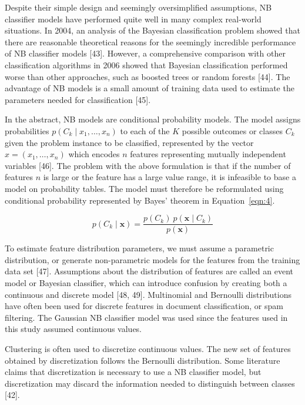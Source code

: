 \documentclass[sn-mathphys-num]{sn-jnl}%
\begin{document}
Despite their simple design and seemingly oversimplified assumptions, NB classifier models have performed quite well in many complex real-world situations. In 2004, an analysis of the Bayesian classification problem showed that there are reasonable theoretical reasons for the seemingly incredible performance of NB classifier models [43]. However, a comprehensive comparison with other classification algorithms in 2006 showed that Bayesian classification performed worse than other approaches, such as boosted trees or random forests [44]. The advantage of NB models is a small amount of training data used to estimate the parameters needed for classification [45].

In the abstract, NB models are conditional probability models. The model assigns probabilities $p(C_{k}\mid x_{1},\ldots, x_{n})$ to each of the $K$ possible outcomes or classes $C_{k}$ given the problem instance to be classified, represented by the vector $x = (x_{1},\ldots, x_{n})$ which encodes $n$ features representing mutually independent variables [46]. The problem with the above formulation is that if the number of features $n$ is large or the feature has a large value range, it is infeasible to base a model on probability tables. The model must therefore be reformulated using conditional probability represented by Bayes' theorem in Equation~\ref{eqn:4}.

\begin{equation}
	p(C_{k}\mid \mathbf{x})={\frac{p(C_{k})\ p(\mathbf{x} \mid C_{k})}{p(\mathbf{x})}}
	\label{eqn:4}
\end{equation}

To estimate feature distribution parameters, we must assume a parametric distribution, or generate non-parametric models for the features from the training data set [47]. Assumptions about the distribution of features are called an event model or Bayesian classifier, which can introduce confusion by creating both a continuous and discrete model [48, 49]. Multinomial and Bernoulli distributions have often been used for discrete features in document classification, or spam filtering. The Gaussian NB classifier model was used since the features used in this study assumed continuous values.

Clustering is often used to discretize continuous values. The new set of features obtained by discretization follows the Bernoulli distribution. Some literature claims that discretization is necessary to use a NB classifier model, but discretization may discard the information needed to distinguish between classes [42].
\end{document}
